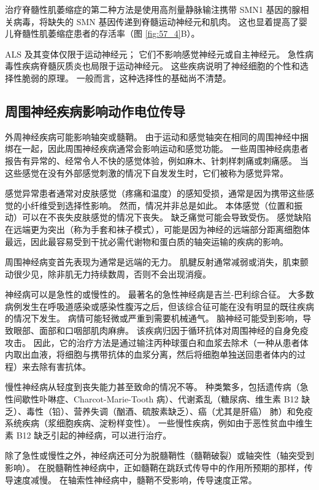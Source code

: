 治疗脊髓性肌萎缩症的第二种方法是使用高剂量静脉输注携带 SMN1 基因的腺相关病毒，将缺失的 SMN 基因传递到脊髓运动神经元和肌肉。
这也显着提高了婴儿脊髓性肌萎缩症患者的存活率（图 \ref{fig:57_4}B）。


ALS 及其变体仅限于运动神经元；
它们不影响感觉神经元或自主神经元。
急性病毒性疾病脊髓灰质炎也局限于运动神经元。
这些疾病说明了神经细胞的个性和选择性脆弱的原理。
一般而言，这种选择性的基础尚不清楚。



\subsection{周围神经疾病影响动作电位传导}

外周神经疾病可能影响轴突或髓鞘。
由于运动和感觉轴突在相同的周围神经中捆绑在一起，因此周围神经疾病通常会影响运动和感觉功能。
一些周围神经病患者报告有异常的、经常令人不快的感觉体验，例如麻木、针刺样刺痛或刺痛感。
当这些感觉在没有外部感觉刺激的情况下自发发生时，它们被称为感觉异常。


感觉异常患者通常对皮肤感觉（疼痛和温度）的感知受损，通常是因为携带这些感觉的小纤维受到选择性影响。 然而，情况并非总是如此。
本体感觉（位置和振动）可以在不丧失皮肤感觉的情况下丧失。 缺乏痛觉可能会导致受伤。
感觉缺陷在远端更为突出（称为手套和袜子模式），可能是因为神经的远端部分距离细胞体最远，因此最容易受到干扰必需代谢物和蛋白质的轴突运输的疾病的影响。


周围神经病变首先表现为通常是远端的无力。
肌腱反射通常减弱或消失，肌束颤动很少见，除非肌无力持续数周，否则不会出现消瘦。


神经病可以是急性的或慢性的。
最著名的急性神经病是吉兰-巴利综合征。
大多数病例发生在呼吸道感染或感染性腹泻之后，但该综合征可能在没有明显的既往疾病的情况下发生。
病情可能轻微或严重到需要机械通气。
脑神经可能受到影响，导致眼部、面部和口咽部肌肉麻痹。
该疾病归因于循环抗体对周围神经的自身免疫攻击。
因此，它的治疗方法是通过输注丙种球蛋白和血浆去除术（一种从患者体内取出血液，将细胞与携带抗体的血浆分离，然后将细胞单独送回患者体内的过程）来去除有害抗体。


慢性神经病从轻度到丧失能力甚至致命的情况不等。
种类繁多，包括遗传病（急性间歇性卟啉症、Charcot-Marie-Tooth 病）、代谢紊乱（糖尿病、维生素 B12 缺乏）、毒性（铅）、营养失调（酗酒、硫胺素缺乏）、癌（尤其是肝癌） 肺）和免疫系统疾病（浆细胞疾病、淀粉样变性）。
一些慢性疾病，例如由于恶性贫血中维生素 B12 缺乏引起的神经病，可以进行治疗。


除了急性或慢性之外，神经病还可分为脱髓鞘性（髓鞘破裂）或轴突性（轴突受到影响）。
在脱髓鞘性神经病中，正如髓鞘在跳跃式传导中的作用所预期的那样，传导速度减慢。
在轴索性神经病中，髓鞘不受影响，传导速度正常。


